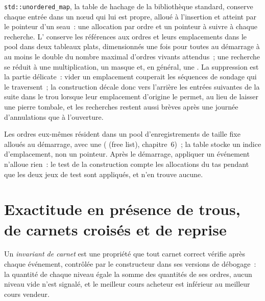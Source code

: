 \texttt{std::unordered\_map}, la table de hachage de la bibliothèque standard, conserve chaque entrée dans un nœud qui lui est propre, alloué à l'insertion
et atteint par le pointeur d'un seau~: une allocation par ordre et un pointeur à suivre à chaque recherche. L' conserve
les références aux ordres et leurs emplacements dans le pool dans deux tableaux plats, dimensionnés une fois pour toutes au démarrage à au moins le double du nombre maximal
d'ordres vivants attendus~; une recherche se réduit à une multiplication, un masque et, en général, une . La suppression est la partie délicate~: vider
un emplacement couperait les séquences de sondage qui le traversent~; la construction décale donc vers l'arrière les entrées suivantes de la suite dans le trou
lorsque leur emplacement d'origine le permet, au lieu de laisser une pierre tombale, et les recherches restent aussi brèves après une journée d'annulations que
à l'ouverture.

\label{lst:ll:the-order-book-builder:erase}

Les ordres eux-mêmes résident dans un pool d'enregistrements de taille fixe alloués au démarrage, avec une  ( (free list), chapitre~6)~; la table stocke
un indice d'emplacement, non un pointeur. Après le démarrage, appliquer un événement n'alloue rien~: le test de la construction compte les allocations du tas
pendant que les deux jeux de test sont appliqués, et n'en trouve aucune.

\section{Exactitude en présence de trous, de carnets croisés et de reprise}

\begin{definition}\label{def:ll:the-order-book-builder:invariant}
Un \emph{invariant de carnet} est une propriété que tout carnet correct vérifie après chaque événement, contrôlée par le constructeur dans ses versions de débogage~:
la quantité de chaque niveau égale la somme des quantités de ses ordres, aucun niveau vide n'est signalé, et le meilleur cours acheteur est inférieur
au meilleur cours vendeur.
\end{definition}

